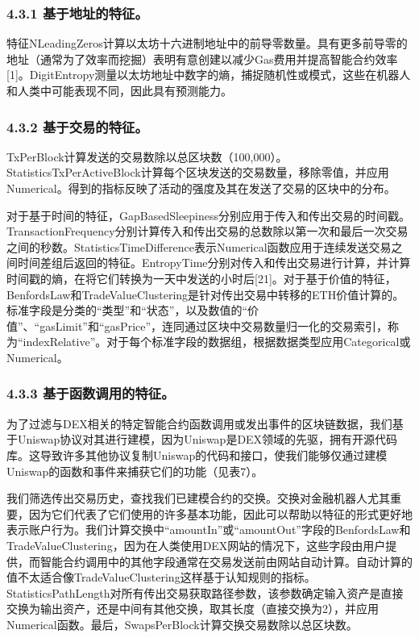 \subsubsection*{4.3.1 基于地址的特征。} 特征NLeadingZeros计算以太坊十六进制地址中的前导零数量。具有更多前导零的地址（通常为了效率而挖掘）表明有意创建以减少Gas费用并提高智能合约效率[1]。DigitEntropy测量以太坊地址中数字的熵，捕捉随机性或模式，这些在机器人和人类中可能表现不同，因此具有预测能力。

\subsubsection*{4.3.2 基于交易的特征。} TxPerBlock计算发送的交易数除以总区块数（100,000）。StatisticsTxPerActiveBlock计算每个区块发送的交易数量，移除零值，并应用Numerical。得到的指标反映了活动的强度及其在发送了交易的区块中的分布。

对于基于时间的特征，GapBasedSleepiness分别应用于传入和传出交易的时间戳。TransactionFrequency分别计算传入和传出交易的总数除以第一次和最后一次交易之间的秒数。StatisticsTimeDifference表示Numerical函数应用于连续发送交易之间时间差组后返回的特征。EntropyTime分别对传入和传出交易进行计算，并计算时间戳的熵，在将它们转换为一天中发送的小时后[21]。对于基于价值的特征，BenfordsLaw和TradeValueClustering是针对传出交易中转移的ETH价值计算的。标准字段是分类的“类型”和“状态”，以及数值的“价值”、“gasLimit”和“gasPrice”，连同通过区块中交易数量归一化的交易索引，称为“indexRelative”。对于每个标准字段的数据组，根据数据类型应用Categorical或Numerical。

\subsubsection*{4.3.3 基于函数调用的特征。} 为了过滤与DEX相关的特定智能合约函数调用或发出事件的区块链数据，我们基于Uniswap协议对其进行建模，因为Uniswap是DEX领域的先驱，拥有开源代码库。这导致许多其他协议复制Uniswap的代码和接口，使我们能够仅通过建模Uniswap的函数和事件来捕获它们的功能（见表7）。

我们筛选传出交易历史，查找我们已建模合约的交换。交换对金融机器人尤其重要，因为它们代表了它们使用的许多基本功能，因此可以帮助以特征的形式更好地表示账户行为。我们计算交换中“amountIn”或“amountOut”字段的BenfordsLaw和TradeValueClustering，因为在人类使用DEX网站的情况下，这些字段由用户提供，而智能合约调用中的其他字段通常在交易发送前由网站自动计算。自动计算的值不太适合像TradeValueClustering这样基于认知规则的指标。StatisticsPathLength对所有传出交易获取路径参数，该参数确定输入资产是直接交换为输出资产，还是中间有其他交换，取其长度（直接交换为2），并应用Numerical函数。最后，SwapsPerBlock计算交换交易数除以总区块数。

